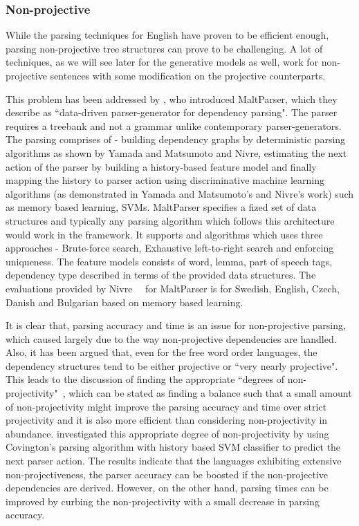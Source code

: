 \subsubsection{Non-projective}

While the parsing techniques for English have proven to be efficient enough, parsing non-projective tree structures can prove to be challenging. A lot of techniques, as we will see later for the generative models as well, work for non-projective sentences with some modification on the projective counterparts. 
          
This problem has been addressed by \cite{nivre2006maltparser,nivre2007maltparser}, who introduced MaltParser, which they describe as ``data-driven parser-generator for dependency parsing". The parser requires a treebank and not a grammar unlike contemporary parser-generators. The parsing comprises of - building dependency graphs by deterministic parsing algorithms as shown by Yamada and Matsumoto and Nivre, estimating the next action of the parser by building a history-based feature model and finally mapping the history to parser action using discriminative machine learning algorithms (as demonstrated in Yamada and Matsumoto's and Nivre's work) such as memory based learning, SVMs. MaltParser specifies a fized set of data structures and typically any parsing algorithm which follows this architecture would work in the framework. It supports \cite{nivre2003efficient} and \cite{covington2001fundamental} algorithms which uses three approaches - Brute-force search, Exhaustive left-to-right search and enforcing uniqueness. The feature models consists of word, lemma, part of speech tags, dependency type described in terms of the provided data structures. The evaluations provided by Nivre~\etal~ for MaltParser is for Swedish, English, Czech, Danish and Bulgarian based on memory based learning.

It is clear that, parsing accuracy and time is an issue for non-projective parsing, which caused largely due to the way non-projective dependencies are handled. Also, it has been argued that, even for the free word order languages, the dependency structures tend to be either projective or ``very nearly projective". This leads to the discussion of finding the appropriate ``degrees of non-projectivity"~\citep{nivre2006constraints}, which can be stated as finding a balance such that a small amount of non-projectivity might improve the parsing accuracy and time over strict projectivity and it is also more efficient than considering non-projectivity in abundance. \cite{nivre2007incremental} investigated this appropriate degree of non-projectivity by using Covington's parsing algorithm with history based SVM classifier to  predict the next parser action. The results indicate that the languages exhibiting extensive non-projectiveness, the parser accuracy can be boosted if the non-projective dependencies are derived. However, on the other hand, parsing times can be improved by curbing the non-projectivity with a small decrease in parsing accuracy. 


